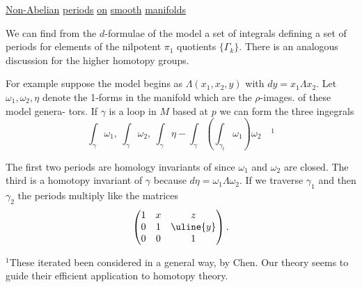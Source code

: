 \uline{Non-Abelian} \uline{periods} \uline{on} \uline{smooth} \uline{manifolds}

We can find from the $d$-formulae of the model a set
of integrals defining a  set of periods for
elements of the nilpotent $\pi_1$\unsure{;|} quotients $\{\Gamma_k\}$. There is an
analogous discussion for the higher homotopy groups.

For example suppose the model begins as $\Lambda(x_1,x_2,y)$
with $dy=x_1\Lambda x_2$. Let $\omega_1,\omega_2,\eta$ denote the 1-forms in
the manifold which are the $\rho$-images. of these model genera-
tors. If $\gamma$ is a loop in $M$ based at $p$ we can form the three
ingegrals
\[
\int_\gamma\omega_1,\ \int_\gamma\omega_2,\
\int_\gamma\eta-\int_\gamma\left(\int_{\gamma_t}\omega_1\right)\omega_2
\quad{}^1
\]

The first two periods are homology invariants of
since $\omega_1$ and $\omega_2$ are closed. The third  is a
homotopy invariant of $\gamma$ because $d\eta=\omega_1\Lambda\omega_2$. If we
traverse $\gamma_1$ and then $\gamma_2$ the periods multiply like the
matrices
\[
\begin{pmatrix}1&x&z\\0&1&\uline{y}\\0&0&1\end{pmatrix}.
\]


${}^1$\quad These iterated   been considered in
a general way, by Chen. Our theory seems to guide
their efficient application to homotopy theory.

